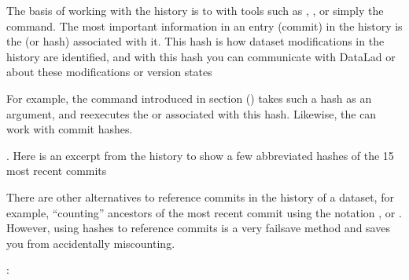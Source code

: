 \sphinxAtStartPar
The basis of working with the history is to  with tools such
as {\hyperref[\detokenize{glossary:term-tig}]{}}, {\hyperref[\detokenize{glossary:term-Gitk}]{}}, or simply the  command.
The most important information in an entry (commit) in the history is
the {\hyperref[\detokenize{glossary:term-shasum}]{}} (or hash) associated with it.
This hash is how dataset modifications in the history are identified,
and with this hash you can communicate with DataLad or {\hyperref[\detokenize{glossary:term-Git}]{}} about these
modifications or version states%
\begin{footnote}\sphinxAtStartFootnote
For example, the  command introduced in section
{\hyperref[\detokenize{basics/101-109-rerun:run2}]{}} () takes such a hash as an argument, and re\sphinxhyphen{}executes
the  or  {\hyperref[\detokenize{glossary:term-run-record}]{}} associated with
this hash. Likewise, the  can work with commit hashes.
%
\end{footnote}.
Here is an excerpt from the  history to show a
few abbreviated hashes of the 15 most recent commits%
\begin{footnote}\sphinxAtStartFootnote
There are other alternatives to reference commits in the history of a dataset,
for example, “counting” ancestors of the most recent commit using the notation
,  or . However, using hashes to reference
commits is a very fail\sphinxhyphen{}save method and saves you from accidentally miscounting.
%
\end{footnote}:

